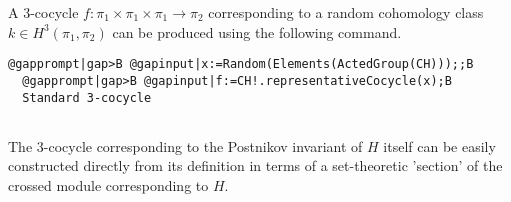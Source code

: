 \documentclass[a4paper,11pt]{report}
\begin{document}
{{\begin{Verbatim}[commandchars=!@|,fontsize=\small,frame=single,label=Example]
\end{Verbatim}
 A $3$-cocycle $f \colon \pi_1 \times \pi_1 \times \pi_1 \rightarrow \pi_2$ corresponding to a random cohomology class $k\in H^3(\pi_1,\pi_2)$ can be produced using the following command. }

 
\begin{Verbatim}[commandchars=@|B,fontsize=\small,frame=single,label=Example]
  @gapprompt|gap>B @gapinput|x:=Random(Elements(ActedGroup(CH)));;B
  @gapprompt|gap>B @gapinput|f:=CH!.representativeCocycle(x);B
  Standard 3-cocycle 
  
\end{Verbatim}
 The $3$-cocycle corresponding to the Postnikov invariant of $H$ itself can be easily constructed directly from its definition in terms of a
set-theoretic 'section' of the crossed module corresponding to $H$. }

 
\end{document}
